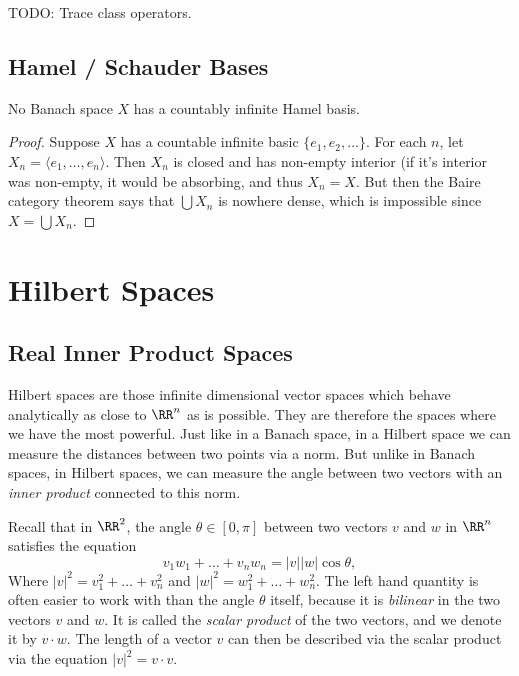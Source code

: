 TODO: Trace class operators.









\section{Hamel / Schauder Bases}

\begin{theorem}
    No Banach space $X$ has a countably infinite Hamel basis.
\end{theorem}
\begin{proof}
    Suppose $X$ has a countable infinite basic $\{ e_1, e_2, \dots \}$. For each $n$, let $X_n = \langle e_1, \dots, e_n \rangle$. Then $X_n$ is closed and has non-empty interior (if it's interior was non-empty, it would be absorbing, and thus $X_n = X$. But then the Baire category theorem says that $\bigcup X_n$ is nowhere dense, which is impossible since $X = \bigcup X_n$.
\end{proof}







\chapter{Hilbert Spaces}

\section{Real Inner Product Spaces}

Hilbert spaces are those infinite dimensional vector spaces which behave analytically as close to $\RR^n$ as is possible. They are therefore the spaces where we have the most powerful. Just like in a Banach space, in a Hilbert space we can measure the distances between two points via a norm. But unlike in Banach spaces, in Hilbert spaces, we can measure the angle between two vectors with an \emph{inner product} connected to this norm.

Recall that in $\RR^2$, the angle $\theta \in [0,\pi]$ between two vectors $v$ and $w$ in $\RR^n$ satisfies the equation
%
\[ v_1w_1 + \dots + v_n w_n = |v||w| \cos \theta, \]
%
Where $|v|^2 = v_1^2 + \dots + v_n^2$ and $|w|^2 = w_1^2 + \dots + w_n^2$. The left hand quantity is often easier to work with than the angle $\theta$ itself, because it is \emph{bilinear} in the two vectors $v$ and $w$. It is called the \emph{scalar product} of the two vectors, and we denote it by $v \cdot w$. The length of a vector $v$ can then be described via the scalar product via the equation $|v|^2 = v \cdot v$.

